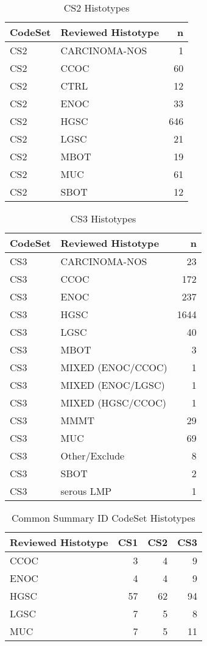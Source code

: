 \documentclass[
]{report}
\begin{document}
\begin{table}

\caption{\label{tab:dist-cs2}CS2 Histotypes}
\centering
\begin{tabular}[t]{l|l|r}
\hline
CodeSet & Reviewed Histotype & n\\
\hline
CS2 & CARCINOMA-NOS & 1\\
\hline
CS2 & CCOC & 60\\
\hline
CS2 & CTRL & 12\\
\hline
CS2 & ENOC & 33\\
\hline
CS2 & HGSC & 646\\
\hline
CS2 & LGSC & 21\\
\hline
CS2 & MBOT & 19\\
\hline
CS2 & MUC & 61\\
\hline
CS2 & SBOT & 12\\
\hline
\end{tabular}
\end{table}

\begin{table}

\caption{\label{tab:dist-cs3}CS3 Histotypes}
\centering
\begin{tabular}[t]{l|l|r}
\hline
CodeSet & Reviewed Histotype & n\\
\hline
CS3 & CARCINOMA-NOS & 23\\
\hline
CS3 & CCOC & 172\\
\hline
CS3 & ENOC & 237\\
\hline
CS3 & HGSC & 1644\\
\hline
CS3 & LGSC & 40\\
\hline
CS3 & MBOT & 3\\
\hline
CS3 & MIXED (ENOC/CCOC) & 1\\
\hline
CS3 & MIXED (ENOC/LGSC) & 1\\
\hline
CS3 & MIXED (HGSC/CCOC) & 1\\
\hline
CS3 & MMMT & 29\\
\hline
CS3 & MUC & 69\\
\hline
CS3 & Other/Exclude & 8\\
\hline
CS3 & SBOT & 2\\
\hline
CS3 & serous LMP & 1\\
\hline
\end{tabular}
\end{table}

\begin{table}

\caption{\label{tab:dist-common}Common Summary ID CodeSet Histotypes}
\centering
\begin{tabular}[t]{l|r|r|r}
\hline
Reviewed Histotype & CS1 & CS2 & CS3\\
\hline
CCOC & 3 & 4 & 9\\
\hline
ENOC & 4 & 4 & 9\\
\hline
HGSC & 57 & 62 & 94\\
\hline
LGSC & 7 & 5 & 8\\
\hline
MUC & 7 & 5 & 11\\
\hline
\end{tabular}
\end{table}
\end{document}
